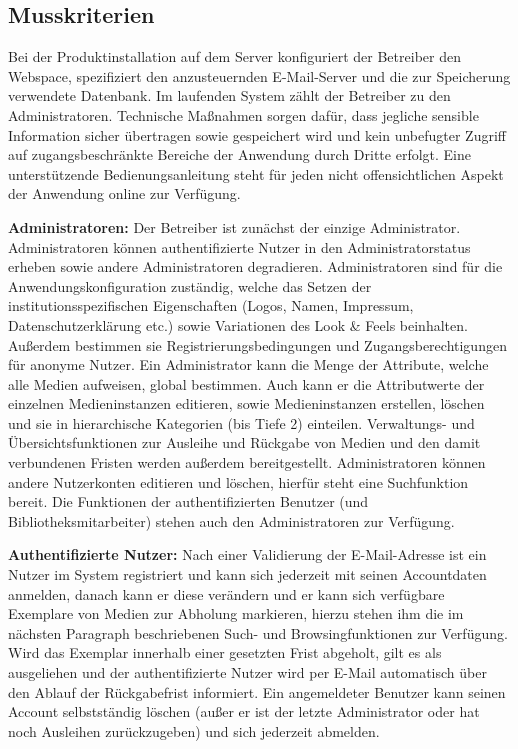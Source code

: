 \documentclass{article}
\begin{document}
\subsection{Musskriterien}
Bei der Produktinstallation auf dem Server konfiguriert der Betreiber den Webspace, spezifiziert den anzusteuernden E-Mail-Server und die zur Speicherung verwendete Datenbank. Im laufenden System zählt der Betreiber zu den Administratoren. Technische Maßnahmen sorgen dafür, dass jegliche sensible Information sicher übertragen sowie gespeichert wird und kein unbefugter Zugriff auf zugangsbeschränkte Bereiche der Anwendung durch Dritte erfolgt. Eine unterstützende Bedienungsanleitung steht für jeden nicht offensichtlichen Aspekt der Anwendung online zur Verfügung.
\begin{flushleft}
\textbf{Administratoren:} Der Betreiber ist zunächst der einzige Administrator. Administratoren können authentifizierte Nutzer in den Administratorstatus erheben sowie andere Administratoren degradieren. Administratoren sind für die Anwendungskonfiguration zuständig, welche das Setzen der institutionsspezifischen Eigenschaften (Logos, Namen, Impressum, Datenschutzerklärung etc.) sowie Variationen des Look \& Feels beinhalten. Außerdem bestimmen sie Registrierungsbedingungen und Zugangsberechtigungen für anonyme Nutzer. Ein Administrator kann die Menge der Attribute, welche alle Medien aufweisen, global bestimmen. Auch kann er die Attributwerte der einzelnen Medieninstanzen editieren, sowie Medieninstanzen erstellen, löschen und sie in hierarchische Kategorien (bis Tiefe 2) einteilen. Verwaltungs- und Übersichtsfunktionen zur Ausleihe und Rückgabe von Medien und den damit verbundenen Fristen werden außerdem bereitgestellt. Administratoren können andere Nutzerkonten editieren und löschen, hierfür steht eine Suchfunktion bereit. Die Funktionen der authentifizierten Benutzer (und Bibliotheksmitarbeiter) stehen auch den Administratoren zur Verfügung.
\end{flushleft}
\begin{flushleft}
\textbf{Authentifizierte Nutzer:} Nach einer Validierung der E-Mail-Adresse ist ein Nutzer im System registriert und kann sich jederzeit mit seinen Accountdaten anmelden, danach kann er diese verändern und er kann sich verfügbare Exemplare von Medien zur Abholung markieren, hierzu stehen ihm die im nächsten Paragraph beschriebenen Such- und Browsingfunktionen zur Verfügung. Wird das Exemplar innerhalb einer gesetzten Frist abgeholt, gilt es als ausgeliehen und der authentifizierte Nutzer wird per E-Mail automatisch über den Ablauf der Rückgabefrist informiert. Ein angemeldeter Benutzer kann seinen Account selbstständig löschen (außer er ist der letzte Administrator oder hat noch Ausleihen zurückzugeben) und sich jederzeit abmelden.
\end{flushleft}
\end{document}
